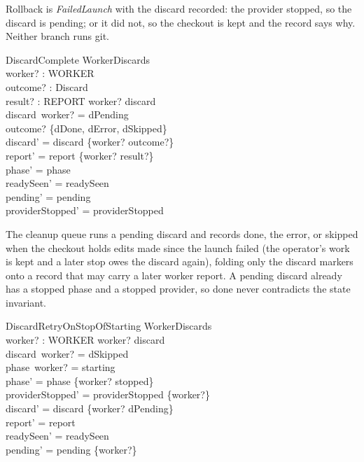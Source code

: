 \documentclass[a4paper,10pt,fleqn]{article}
\begin{document}
Rollback is \textit{FailedLaunch} with the discard recorded: the provider
stopped, so the discard is pending; or it did not, so the checkout is kept
and the record says why. Neither branch runs git.

\begin{schema}{DiscardComplete}
  \Delta WorkerDiscards \\
  worker? : WORKER \\
  outcome? : Discard \\
  result? : REPORT
\where
  worker? \in \dom discard \\
  discard~worker? = dPending \\
  outcome? \in \{dDone, dError, dSkipped\} \\
  discard' = discard \oplus \{worker? \mapsto outcome?\} \\
  report' = report \oplus \{worker? \mapsto result?\} \\
  phase' = phase \\
  readySeen' = readySeen \\
  pending' = pending \\
  providerStopped' = providerStopped
\end{schema}

The cleanup queue runs a pending discard and records done, the error, or
skipped when the checkout holds edits made since the launch failed (the
operator's work is kept and a later stop owes the discard again), folding
only the discard markers onto a record that may carry a later worker
report. A pending discard already has a stopped phase and a stopped
provider, so done never contradicts the state invariant.

\begin{schema}{DiscardRetryOnStopOfStarting}
  \Delta WorkerDiscards \\
  worker? : WORKER
\where
  worker? \in \dom discard \\
  discard~worker? = dSkipped \\
  phase~worker? = starting \\
  phase' = phase \oplus \{worker? \mapsto stopped\} \\
  providerStopped' = providerStopped \cup \{worker?\} \\
  discard' = discard \oplus \{worker? \mapsto dPending\} \\
  report' = report \\
  readySeen' = readySeen \\
  pending' = pending \cup \{worker?\}
\end{schema}
\end{document}
